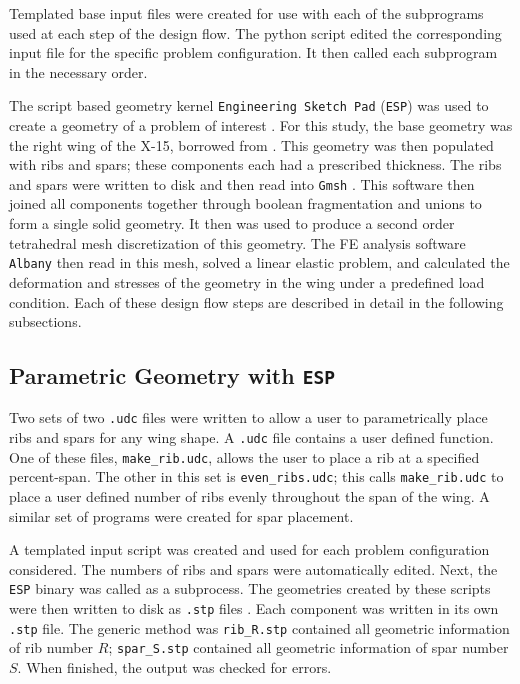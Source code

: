 \documentclass[conf]{new-aiaa}
\begin{document}
\noindent
Templated base input files were created for use with each 
of the subprograms used at each step of the design flow.
The python script edited the corresponding input file for the specific problem 
configuration.
It then called each subprogram in the necessary order.

The script based geometry kernel
\texttt{Engineering Sketch Pad} (\texttt{ESP})
was used to create a geometry of a problem of interest
\cite{haimes_ESP_solid_modeling_feature_based_web_enabled_system_param_geom}.
For this study, the base geometry was the right wing
of the X-15, borrowed from 
\cite{gochenaur_rapid_geometry_generation_and_basic_comparison_x15}.
This geometry was then populated with ribs and spars;
these components each had a prescribed thickness.
The ribs and spars
were written to disk and then read into \texttt{Gmsh} 
\cite{geuzaine_GMSH_3D_FE_mesh_generator}.
This software then joined all components together through
boolean fragmentation and unions to form a single solid geometry. 
It then was used to produce a second order 
tetrahedral mesh discretization of this geometry.
The FE analysis software \texttt{Albany} 
\cite{salinger_albany_using_component_based_design_to_dev_flex_multiphysics}
then read in this mesh, 
solved a linear elastic problem, 
and calculated the deformation and stresses of the geometry 
in the wing under a predefined load condition.
Each of these design flow steps are described in detail 
in the following subsections.

\subsection{Parametric Geometry with \texttt{ESP}} \label{sec:meth_esp}
Two sets of two \texttt{.udc} files were written to allow a user to 
parametrically place ribs and spars for any wing shape. 
A \texttt{.udc} file contains a user defined function.
One of these files, \texttt{make\_rib.udc}, allows the user 
to place a rib at a specified percent-span.
The other in this set is \texttt{even\_ribs.udc};
this calls \texttt{make\_rib.udc} to place a user defined number of ribs
evenly throughout the span of the wing.
A similar set of programs were created for spar placement.

A templated input script was created and used for 
each problem configuration considered.
The numbers of ribs and spars were automatically edited.
Next, the \texttt{ESP} binary was called as a subprocess.
The geometries created by these scripts were then written to 
disk as \texttt{.stp} files
\cite{iso_10303_21_2016_step_files}.
Each component was written in its own \texttt{.stp} file.
The generic method was \texttt{rib\_R.stp} contained all
geometric information of rib number $R$;
\texttt{spar\_S.stp} contained all
geometric information of spar number $S$.
When finished, the output was checked for errors.
\end{document}
